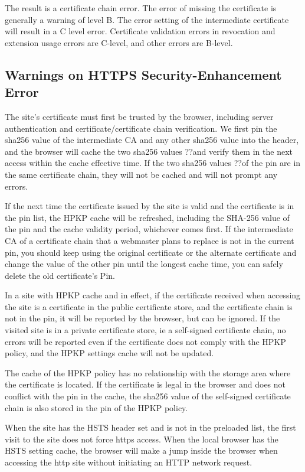 The result is a certificate chain error. The error of missing the certificate is generally a warning of level B. The error setting of the intermediate certificate will result in a C level error. Certificate validation errors in revocation and extension usage errors are C-level, and other errors are B-level.




\subsection{Warnings on HTTPS Security-Enhancement Error}
The site's certificate must first be trusted by the browser, including server authentication and certificate/certificate chain verification. We first pin the sha256 value of the intermediate CA and any other sha256 value into the header, and the browser will cache the two sha256 values ??and verify them in the next access within the cache effective time. If the two sha256 values ??of the pin are in the same certificate chain, they will not be cached and will not prompt any errors.

If the next time the certificate issued by the site is valid and the certificate is in the pin list, the HPKP cache will be refreshed, including the SHA-256 value of the pin and the cache validity period, whichever comes first. If the intermediate CA of a certificate chain that a webmaster plans to replace is not in the current pin, you should keep using the original certificate or the alternate certificate and change the value of the other pin until the longest cache time, you can safely delete the old certificate's Pin.

In a site with HPKP cache and in effect, if the certificate received when accessing the site is a certificate in the public certificate store, and the certificate chain is not in the pin, it will be reported by the browser, but can be ignored. If the visited site is in a private certificate store, ie a self-signed certificate chain, no errors will be reported even if the certificate does not comply with the HPKP policy, and the HPKP settings cache will not be updated.

The cache of the HPKP policy has no relationship with the storage area where the certificate is located. If the certificate is legal in the browser and does not conflict with the pin in the cache, the sha256 value of the self-signed certificate chain is also stored in the pin of the HPKP policy.

When the site has the HSTS header set and is not in the preloaded list, the first visit to the site does not force https access. When the local browser has the HSTS setting cache, the browser will make a jump inside the browser when accessing the http site without initiating an HTTP network request.


